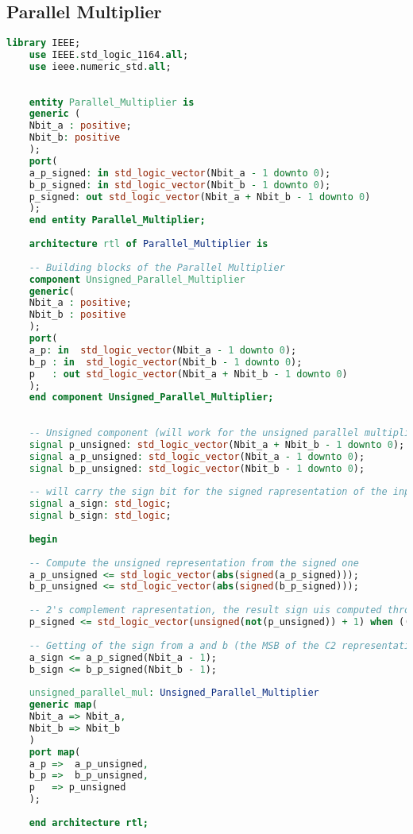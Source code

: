 \subsection{Parallel Multiplier}
\begin{lstlisting}[language=VHDL]
	library IEEE;
	use IEEE.std_logic_1164.all;
	use ieee.numeric_std.all;
	
	
	entity Parallel_Multiplier is
	generic (
	Nbit_a : positive; 
	Nbit_b: positive
	);
	port(
	a_p_signed: in std_logic_vector(Nbit_a - 1 downto 0);
	b_p_signed: in std_logic_vector(Nbit_b - 1 downto 0);
	p_signed: out std_logic_vector(Nbit_a + Nbit_b - 1 downto 0)
	);
	end entity Parallel_Multiplier;
	
	architecture rtl of Parallel_Multiplier is
	
	-- Building blocks of the Parallel Multiplier
	component Unsigned_Parallel_Multiplier
	generic(
	Nbit_a : positive;
	Nbit_b : positive
	);
	port(
	a_p: in  std_logic_vector(Nbit_a - 1 downto 0);
	b_p : in  std_logic_vector(Nbit_b - 1 downto 0);
	p   : out std_logic_vector(Nbit_a + Nbit_b - 1 downto 0)
	);
	end component Unsigned_Parallel_Multiplier;
	
	
	-- Unsigned component (will work for the unsigned parallel multiplier
	signal p_unsigned: std_logic_vector(Nbit_a + Nbit_b - 1 downto 0);
	signal a_p_unsigned: std_logic_vector(Nbit_a - 1 downto 0);
	signal b_p_unsigned: std_logic_vector(Nbit_b - 1 downto 0);
	
	-- will carry the sign bit for the signed rapresentation of the inputs
	signal a_sign: std_logic;
	signal b_sign: std_logic;
	
	begin
	
	-- Compute the unsigned representation from the signed one
	a_p_unsigned <= std_logic_vector(abs(signed(a_p_signed)));
	b_p_unsigned <= std_logic_vector(abs(signed(b_p_signed)));
	
	-- 2's complement rapresentation, the result sign uis computed through the xor op. between a and b
	p_signed <= std_logic_vector(unsigned(not(p_unsigned)) + 1) when (((a_sign xor b_sign) = '1')) else p_unsigned;
	
	-- Getting of the sign from a and b (the MSB of the C2 representation)
	a_sign <= a_p_signed(Nbit_a - 1);
	b_sign <= b_p_signed(Nbit_b - 1);
	
	unsigned_parallel_mul: Unsigned_Parallel_Multiplier
	generic map(
	Nbit_a => Nbit_a,
	Nbit_b => Nbit_b
	)
	port map(
	a_p =>  a_p_unsigned,
	b_p =>  b_p_unsigned,
	p   => p_unsigned
	);
	
	end architecture rtl; 
\end{lstlisting}


